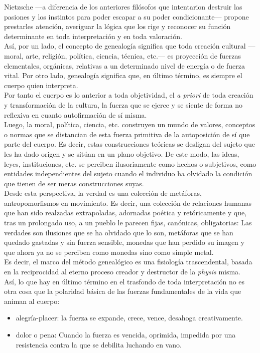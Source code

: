 \documentclass[a4paper, 10pt, twocolumn, spanish]{article}
\begin{document}
Nietzsche —a diferencia de los anteriores filósofos que intentarion
destruir las pasiones y los instintos para poder escapar a su poder
condicionante— propone prestarles atención, averiguar la lógica que
los rige y reconocer su función determinante en toda interpretación y
en toda valoración.\\[0pt]
Así, por un lado, el concepto de genealogía significa que toda
creación cultural —moral, arte, religión, política, ciencia, técnica,
etc.— es proyección de fuerzas elementales, orgánicas, relativas a un
determinado nivel de energía o de fuerza vital. Por otro lado,
genealogía significa que, en último término, es siempre el cuerpo
quien interpreta.\\[0pt]
Por tanto el cuerpo es lo anterior a toda objetividad, el \emph{a priori}
de toda creación y transformación de la cultura, la fuerza que se
ejerce y se siente de forma no reflexiva en cuanto autofirmación de sí
misma.\\[0pt]

Luego, la moral, política, ciencia, etc. construyen un mundo de
valores, conceptos o normas que se distancian de esta fuerza primitiva
de la autoposición de sí que parte del cuerpo. Es decir, estas
construcciones teóricas se desligan del sujeto que les ha dado origen
y se sitúan en un plano objetivo. De este modo, las ideas, leyes,
instituciones, etc. se perciben ilusoriamente como hechos o
subjetivos, como entidades independientes del sujeto cuando el
individuo ha olvidado la condición que tienen de ser meras
construcciones suyas.\\[0pt]

Desde esta perspectiva, la verdad es una colección de metáforas,
antropomorfismos en movimiento. Es decir, una colección de relaciones
humanas que han sido realzadas extrapoladas, adornadas poética y
retóricamente y que, tras un prolongado uso, a un pueblo le parecen
fijas, canónicas, obligatorias: Las verdades son ilusiones que se ha
olvidado que lo son, metáforas que se han quedado gastadas y sin
fuerza sensible, monedas que han perdido su imagen y que ahora ya no
se perciben como monedas sino como simple metal.\\[0pt]
Es decir, el marco del método genealógico es una fisiología
trascendental, basada en la reciprocidad al eterno proceso creador y
destructor de la \emph{physis} misma.\\[0pt]

Así, lo que hay en último término en el trasfondo de toda
interpretación no es otra cosa que la polaridad básica de las fuerzas
fundamentales de la vida que animan al cuerpo:
\begin{itemize}
\item alegría-placer: la fuerza se expande, crece, vence, desahoga
creativamente.
\item dolor o pena: Cuando la fuerza es vencida, oprimida, impedida por
una resistencia contra la que se debilita luchando en vano.
\end{itemize}
\end{document}
